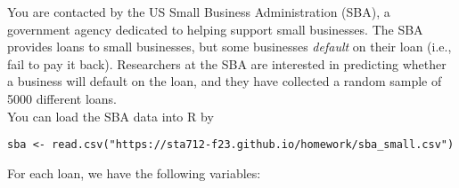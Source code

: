 \documentclass[11pt]{article}
\begin{document}
You are contacted by the US Small Business Administration (SBA), a government agency dedicated to helping support small businesses. The SBA provides loans to small businesses, but some businesses \textit{default} on their loan (i.e., fail to pay it back). Researchers at the SBA are interested in predicting whether a business will default on the loan, and they have collected a random sample of 5000 different loans.\\

\noindent You can load the SBA data into R by

\begin{verbatim}
sba <- read.csv("https://sta712-f23.github.io/homework/sba_small.csv")
\end{verbatim}


\noindent For each loan, we have the following variables:
\end{document}
